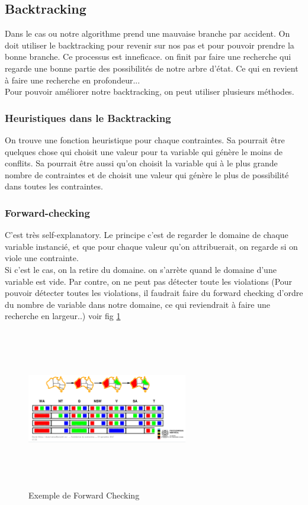 \documentclass[oneside]{book}
\begin{document}
\subsection{Backtracking}
Dans le cas ou notre algorithme prend une mauvaise branche par accident. On doit utiliser le backtracking pour revenir sur nos pas et pour pouvoir prendre la bonne branche.
Ce processus est inneficace. on finit par faire une recherche qui regarde une bonne partie des possibilités de notre arbre d'état. Ce qui en revient à faire une recherche en profondeur... \\
Pour pouvoir améliorer notre backtracking, on peut utiliser plusieurs méthodes.

\subsubsection{Heuristiques dans le Backtracking}
On trouve une fonction heuristique pour chaque contraintes. Sa pourrait être quelques chose qui choisit une valeur pour ta variable qui génère le moins de conflits. Sa pourrait être aussi qu'on choisit la variable qui à le plus grande nombre de contraintes et de choisit une valeur qui génère le plus de possibilité dans toutes les contraintes.

\subsubsection{Forward-checking}
C'est très self-explanatory. Le principe c'est de regarder le domaine de chaque variable instancié, et que pour chaque valeur qu'on attribuerait, on regarde si on viole une contrainte. \\

Si c'est le cas, on la retire du domaine. on s'arrète quand le domaine d'une variable est vide. Par contre, on ne peut pas détecter toute les violations (Pour pouvoir détecter toutes les violations, il faudrait faire du forward checking d'ordre du nombre de variable dans notre domaine, ce qui reviendrait à faire une recherche en largeur..) voir fig \ref{fig:forward_checking}

\begin{figure}[!ht]
\centering
\includegraphics[width = 7cm, height = 7cm, keepaspectratio]{forward_checking.png}
\caption{Exemple de Forward Checking}
\label{fig:forward_checking}
\end{figure}
\end{document}
